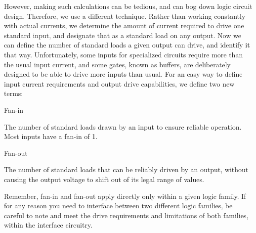However, making such calculations can be tedious, and can bog down logic circuit design. Therefore, we use a different technique. Rather than working constantly with actual currents, we determine the amount of current required to drive one standard input, and designate that as a standard load on any output. Now we can define the number of standard loads a given output can drive, and identify it that way. Unfortunately, some inputs for specialized circuits require more than the usual input current, and some gates, known as buffers, are deliberately designed to be able to drive more inputs than usual. For an easy way to define input current requirements and output drive capabilities, we define two new terms:

Fan-in

The number of standard loads drawn by an input to ensure reliable operation. Most inputs have a fan-in of 1.

Fan-out

The number of standard loads that can be reliably driven by an output, without causing the output voltage to shift out of its legal range of values.

Remember, fan-in and fan-out apply directly only within a given logic family. If for any reason you need to interface between two different logic families, be careful to note and meet the drive requirements and limitations of both families, within the interface circuitry.
